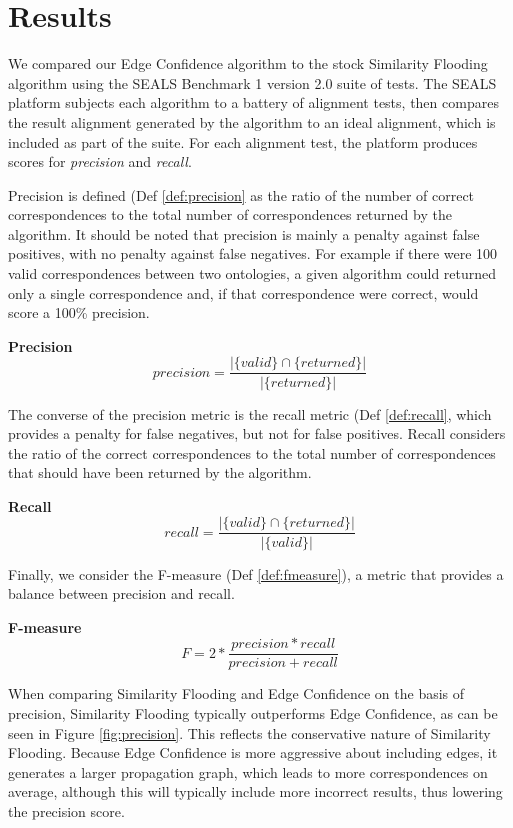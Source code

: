 \documentclass[letterpaper,twocolumn,12pt]{article}
\begin{document}
\section{Results}
\label{sec:results}
We compared our Edge Confidence algorithm to the stock Similarity Flooding algorithm
using the SEALS Benchmark 1 version 2.0 suite of tests. The SEALS platform subjects
each algorithm to a battery of alignment tests, then compares the result alignment
generated by the algorithm to an ideal alignment, which is included as part of the suite.
For each alignment test, the platform produces scores for \textit{precision} and \textit{recall}.

Precision is defined (Def \ref{def:precision} as the ratio of the number of correct correspondences to the total number
of correspondences returned by the algorithm. It should be noted that precision is mainly
a penalty against false positives, with no penalty against false negatives. For example if there
were 100 valid correspondences between two ontologies, a given algorithm could returned only a single
correspondence and, if that correspondence were correct, would score a 100\% precision. 

\begin{defn}
\textbf{Precision}
\label{def:precision}
$$
	precision = \frac{|\{valid \} \cap  \{returned \}|}{|\{returned \}|}
$$
\end{defn}

The converse of the precision metric is the recall metric (Def \ref{def:recall}, which provides a penalty for 
false negatives, but not for false positives. Recall considers the ratio of the correct
correspondences to the total number of correspondences that should have been returned by
the algorithm.

\begin{defn}
\textbf{Recall}
\label{def:recall}
$$
	recall = \frac{|\{valid \} \cap  \{returned \}|}{|\{valid \}|}
$$
\end{defn}

Finally, we consider the F-measure (Def \ref{def:fmeasure}), a metric that provides a 
balance between precision and recall. 

\begin{defn}
				\textbf{F-measure}
\label{def:fmeasure}
$$
	F = 2*\frac{precision * recall}{precision + recall}	
$$
\end{defn}

When comparing Similarity Flooding and Edge Confidence on the basis of precision,
Similarity Flooding typically outperforms Edge Confidence, as can be seen in Figure
\ref{fig:precision}. This reflects the conservative nature of Similarity Flooding.
Because Edge Confidence is more aggressive about including edges, it generates a 
larger propagation graph, which leads to more correspondences on average, although
this will typically include more incorrect results, thus lowering the precision
score.
\end{document}
